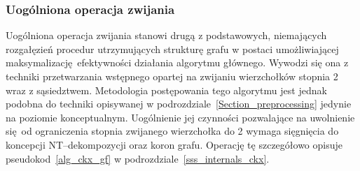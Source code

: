 \subsubsection{\textbf{Uogólniona operacja zwijania}}\label{sss_ckx_general_fold}
\par{
  Uogólniona operacja zwijania stanowi drugą z podstawowych, niemających rozgałęzień procedur utrzymujących strukturę grafu w postaci umożliwiającej maksymalizację efektywności działania algorytmu głównego.
  Wywodzi się ona z techniki przetwarzania wstępnego opartej na zwijaniu wierzchołków stopnia 2 wraz z sąsiedztwem.
  Metodologia postępowania tego algorytmu jest jednak podobna do techniki opisywanej w podrozdziale~\ref{Section_preprocessing} jedynie na poziomie konceptualnym.
  Uogólnienie jej czynności pozwalające na uwolnienie się od ograniczenia stopnia zwijanego wierzchołka do 2 wymaga sięgnięcia do koncepcji NT--dekompozycji oraz koron grafu.
  Operację tę szczegółowo opisuje pseudokod~\ref{alg_ckx_gf} w podrozdziale~\ref{sss_internals_ckx}.
}
